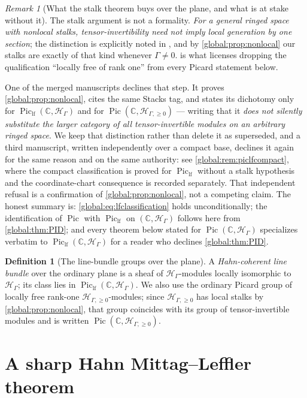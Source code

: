 \documentclass[11pt,letterpaper]{article}
\theoremstyle{definition}
\newtheorem{definition}[definition]{Definition}
\theoremstyle{remark}
\newtheorem{remark}[remark]{Remark}
\newcommand{\C}{\mathbb C}
\newcommand{\HH}{\mathscr H_\Gamma}
\newcommand{\HI}{\mathscr H_{\Gamma,\ge0}}
\newcommand{\Pic}{\operatorname{Pic}}
\newcommand{\Piclf}{\operatorname{Pic}_{\mathrm{lf}}}
\numberwithin{equation}{section}
\begin{document}
\begin{remark}[What the stalk theorem buys over the plane, and what is at stake without it]\label{global:rem:piclf}
The stalk argument is not a formality. \emph{For a general ringed space with nonlocal stalks, tensor-invertibility need not imply local generation by one section}; the distinction is explicitly noted in \cite[Tag~09NT]{Stacks}, and by \cref{global:prop:nonlocal} our stalks are exactly of that kind whenever $\Gamma\ne0$.  is what licenses dropping the qualification ``locally free of rank one'' from every Picard statement below.

One of the merged manuscripts declines that step. It proves \cref{global:prop:nonlocal}, cites the same Stacks tag, and states its dichotomy only for $\Piclf(\C,\HH)$ and for $\Pic(\C,\HI)$ --- writing that it \emph{does not silently substitute the larger category of all tensor-invertible modules on an arbitrary ringed space}. We keep that distinction rather than delete it as superseded, and a third manuscript, written independently over a compact base, declines it again for the same reason and on the same authority: see \cref{global:rem:piclfcompact}, where the compact classification is proved for $\Piclf$ without a stalk hypothesis and the coordinate-chart consequence is recorded separately. That independent refusal is a confirmation of \cref{global:prop:nonlocal}, not a competing claim. The honest summary is: \eqref{global:eq:lfclassification} holds unconditionally; the identification of $\Pic$ with $\Piclf$ on $(\C,\HH)$ follows here from \cref{global:thm:PID}; and every theorem below stated for $\Pic(\C,\HH)$ specializes verbatim to $\Piclf(\C,\HH)$ for a reader who declines \cref{global:thm:PID}.
\end{remark}

\begin{definition}[The line-bundle groups over the plane]\label{global:def:bundles}
A \emph{Hahn-coherent line bundle} over the ordinary plane is a sheaf of $\HH$-modules locally isomorphic to $\HH$; its class lies in $\Piclf(\C,\HH)$. We also use the ordinary Picard group of locally free rank-one $\HI$-modules; since $\HI$ has local stalks by \cref{global:prop:nonlocal}, that group coincides with its group of tensor-invertible modules and is written $\Pic(\C,\HI)$.
\end{definition}

\section{A sharp Hahn Mittag--Leffler theorem}\label{global:sec:ML}
\end{document}
